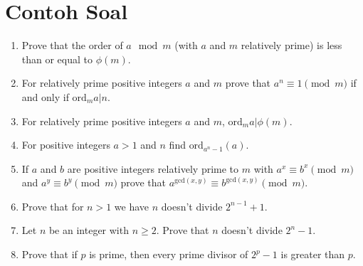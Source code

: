 \documentclass[12pt]{scrartcl}
\begin{document}
\section{Contoh Soal}
\begin{enumerate}
    \item Prove that the order of $a \mod m$ (with $a$ and $m$ relatively prime) is less than or equal to $\phi(m)$.

    \item For relatively prime positive integers $a$ and $m$ prove that $a^n \equiv 1 \pmod{m}$ if and only if $\text{ord}_m a | n$.

    \item For relatively prime positive integers $a$ and $m$, $\text{ord}_m a | \phi(m)$.
    
    \item For positive integers $a > 1$ and $n$ find $\text{ord}_{a^n-1} (a)$.

    \item If $a$ and $b$ are positive integers relatively prime to $m$ with $a^x \equiv b^x \pmod{m}$ and $a^y \equiv b^y \pmod{m}$ prove that $a^{\text{gcd}(x,y)} \equiv b^{\text{gcd}(x,y)} \pmod{m}$.

    \item Prove that for $n > 1$ we have $n$ doesn't divide $2^{n-1} + 1$.

    \item Let $n$ be an integer with $n \geq 2$. Prove that $n$ doesn’t divide $2^n - 1$.

    \item Prove that if $p$ is prime, then every prime divisor of $2^p - 1$ is greater than $p$.
\end{enumerate}
\end{document}

